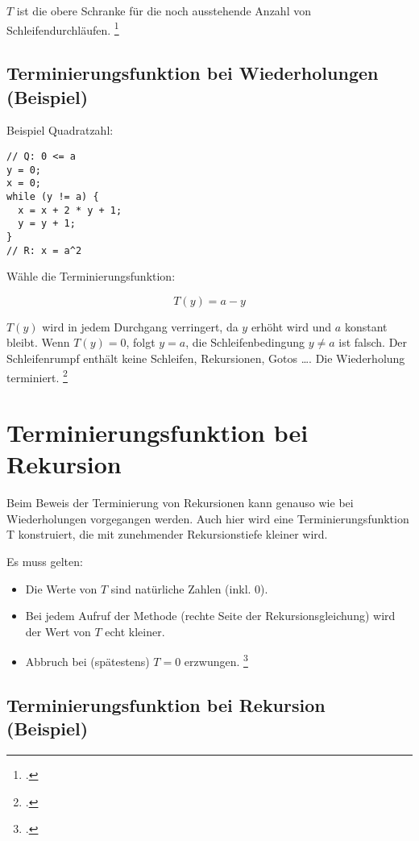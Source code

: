 \documentclass{lehramt-informatik-haupt}
\begin{document}
$T$ ist die obere Schranke für die noch ausstehende Anzahl von
Schleifendurchläufen.
\footcite[Seite 33]{sosy:fs:5}

%

\subsection{Terminierungsfunktion bei Wiederholungen (Beispiel)}

Beispiel Quadratzahl:

\begin{verbatim}
// Q: 0 <= a
y = 0;
x = 0;
while (y != a) {
  x = x + 2 * y + 1;
  y = y + 1;
}
// R: x = a^2
\end{verbatim}

\noindent
Wähle die Terminierungsfunktion:

\begin{displaymath}
T(y) = a - y
\end{displaymath}

\noindent
$T(y)$ wird in jedem Durchgang verringert, da $y$ erhöht wird und $a$
konstant bleibt. Wenn $T(y) = 0$, folgt $y = a$, \dh die
Schleifenbedingung $y \neq a$ ist falsch. Der Schleifenrumpf enthält
keine Schleifen, Rekursionen, Gotos …. Die Wiederholung terminiert.
\footcite[Seite 34]{sosy:fs:5}

\section{Terminierungsfunktion bei Rekursion}

Beim Beweis der Terminierung von Rekursionen kann
genauso wie bei Wiederholungen vorgegangen werden.
Auch hier wird eine Terminierungsfunktion T konstruiert,
die mit zunehmender Rekursionstiefe kleiner wird.

Es muss gelten:
\begin{itemize}
\item Die Werte von $T$ sind natürliche Zahlen (inkl. $0$).

\item Bei jedem Aufruf der Methode (rechte Seite der
Rekursionsgleichung) wird der Wert von $T$ echt kleiner.

\item Abbruch bei (spätestens) $T = 0$ erzwungen.
\footcite[Seite 36]{sosy:fs:5}
\end{itemize}

%

\subsection{Terminierungsfunktion bei Rekursion (Beispiel)}
\end{document}
